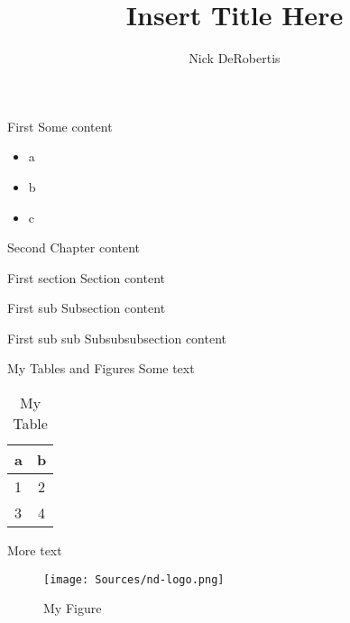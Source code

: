 \documentclass[]{uf-thesis-dissertation}
\title{Insert Title Here}
\author{Nick DeRobertis}
\begin{document}
\begin{chapter}{First}
Some content
\begin{itemize}
\item a
\item b
\item c
\end{itemize}
\end{chapter}
\begin{chapter}{Second}
Chapter content
\begin{section}{First section}
Section content
\begin{subsection}{First sub}
Subsection content
\begin{subsubsection}{First sub sub}
Subsubsubsection content
\citep{person}
\end{subsubsection}
\end{subsection}
\end{section}
\end{chapter}
\begin{chapter}{My Tables and Figures}
Some text
\begin{table}
\centering
\begin{threeparttable}
\caption{My Table}
\begin{tabular}{lc}
\toprule
a & b\\
\midrule
1 & 2 \\
3 & 4 \\
\bottomrule

\end{tabular}
\end{threeparttable}
\end{table}
More text
\begin{figure}
\texttt{[image: Sources/nd-logo.png]}
\caption{My Figure}
\end{figure}
\end{chapter}
\end{document}
